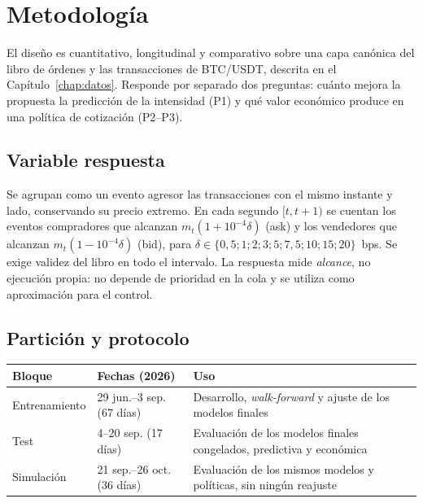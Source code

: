 \chapter{Metodología}
\label{chap:metodologia}

El diseño es cuantitativo, longitudinal y comparativo sobre una capa canónica del libro de órdenes y las transacciones de BTC/USDT, descrita en el Capítulo~\ref{chap:datos}. Responde por separado dos preguntas: cuánto mejora la propuesta la predicción de la intensidad (P1) y qué valor económico produce en una política de cotización (P2--P3).

\section{Variable respuesta}
Se agrupan como un evento agresor las transacciones con el mismo instante y lado, conservando su precio extremo. En cada segundo $[t,t+1)$ se cuentan los eventos compradores que alcanzan $m_t(1+10^{-4}\delta)$ (ask) y los vendedores que alcanzan $m_t(1-10^{-4}\delta)$ (bid), para $\delta\in\{0{,}5;1;2;3;5;7{,}5;10;15;20\}$~bps. Se exige validez del libro en todo el intervalo. La respuesta mide \emph{alcance}, no ejecución propia: no depende de prioridad en la cola y se utiliza como aproximación para el control.

\section{Partición y protocolo}
\label{sec:particion}
\begin{center}\small
\begin{tabular}{@{}llp{}@{}}\toprule
Bloque & Fechas (2026) & Uso\\\midrule
Entrenamiento & 29 jun.--3 sep. (67 días) & Desarrollo, \textit{walk-forward} y ajuste de los modelos finales\\
Test & 4--20 sep. (17 días) & Evaluación de los modelos finales congelados, predictiva y económica\\
Simulación & 21 sep.--26 oct. (36 días) & Evaluación de los mismos modelos y políticas, sin ningún reajuste\\\bottomrule
\end{tabular}
\end{center}

